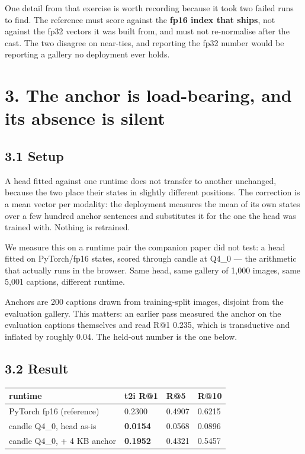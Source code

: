 \documentclass[
  11pt,
]{article}
\newcounter{none} %
\begin{document}
One detail from that exercise is worth recording because it took two
failed runs to find. The reference must score against the \textbf{fp16
index that ships}, not against the fp32 vectors it was built from, and
must not re-normalise after the cast. The two disagree on near-ties, and
reporting the fp32 number would be reporting a gallery no deployment
ever holds.

\section{3. The anchor is load-bearing, and its absence is
silent}\label{the-anchor-is-load-bearing-and-its-absence-is-silent}

\subsection{3.1 Setup}\label{setup}

A head fitted against one runtime does not transfer to another
unchanged, because the two place their states in slightly different
positions. The correction is a mean vector per modality: the deployment
measures the mean of its own states over a few hundred anchor sentences
and substitutes it for the one the head was trained with. Nothing is
retrained.

We measure this on a runtime pair the companion paper did not test: a
head fitted on PyTorch/fp16 states, scored through candle at Q4\_0 ---
the arithmetic that actually runs in the browser. Same head, same
gallery of 1,000 images, same 5,001 captions, different runtime.

Anchors are 200 captions drawn from training-split images, disjoint from
the evaluation gallery. This matters: an earlier pass measured the
anchor on the evaluation captions themselves and read R@1 0.235, which
is transductive and inflated by roughly 0.04. The held-out number is the
one below.

\subsection{3.2 Result}\label{result}

{\def\LTcaptype{none} %
\begin{longtable}[]{@{}llll@{}}
\toprule\noalign{}
runtime & t2i R@1 & R@5 & R@10 \\
\midrule\noalign{}
\endhead
\bottomrule\noalign{}
\endlastfoot
PyTorch fp16 (reference) & 0.2300 & 0.4907 & 0.6215 \\
candle Q4\_0, head as-is & \textbf{0.0154} & 0.0568 & 0.0896 \\
candle Q4\_0, + 4 KB anchor & \textbf{0.1952} & 0.4321 & 0.5457 \\
\end{longtable}
}
\end{document}
